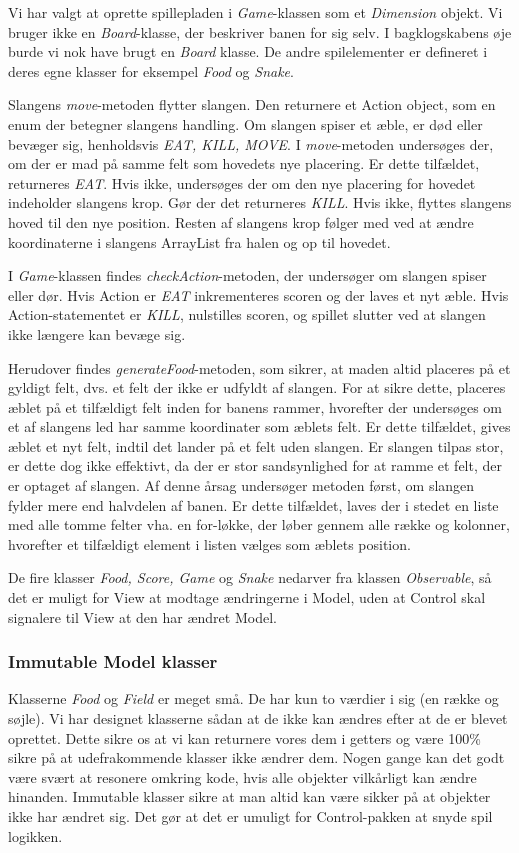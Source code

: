 Vi har valgt at oprette spillepladen i \textit{Game}-klassen som et \textit{Dimension} objekt. Vi bruger ikke en \textit{Board}-klasse, der beskriver banen for sig selv. I bagklogskabens øje burde vi nok have brugt en \textit{Board} klasse. De andre spilelementer er defineret i deres egne klasser for eksempel \textit{Food} og \textit{Snake}.

Slangens \textit{move}-metoden flytter slangen. Den returnere et Action object, som en enum der betegner slangens handling. Om slangen spiser et æble, er død eller bevæger sig, henholdsvis \textit{EAT, KILL, MOVE}. I \textit{move}-metoden undersøges der, om der er mad på samme felt som hovedets nye placering. Er dette tilfældet, returneres \textit{EAT}. Hvis ikke, undersøges der om den nye placering for hovedet indeholder slangens krop. Gør der det returneres \textit{KILL}. Hvis ikke, flyttes slangens hoved til den nye position. Resten af slangens krop følger med ved at ændre koordinaterne i slangens ArrayList fra halen og op til hovedet.

I \textit{Game}-klassen findes \textit{checkAction}-metoden, der undersøger om slangen spiser eller dør. Hvis Action er \textit{EAT} inkrementeres scoren og der laves et nyt æble. Hvis Action-statementet er \textit{KILL}, nulstilles scoren, og spillet slutter ved at slangen ikke længere kan bevæge sig.

Herudover findes \textit{generateFood}-metoden, som sikrer, at maden altid placeres på et gyldigt felt, dvs. et felt der ikke er udfyldt af slangen. For at sikre dette, placeres æblet på et tilfældigt felt inden for banens rammer, hvorefter der undersøges om et af slangens led har samme koordinater som æblets felt. Er dette tilfældet, gives æblet et nyt felt, indtil det lander på et felt uden slangen. Er slangen tilpas stor, er dette dog ikke effektivt, da der er stor sandsynlighed for at ramme et felt, der er optaget af slangen. Af denne årsag undersøger metoden først, om slangen fylder mere end halvdelen af banen. Er dette tilfældet, laves der i stedet en liste med alle tomme felter vha. en for-løkke, der løber gennem alle række og kolonner, hvorefter et tilfældigt element i listen vælges som æblets position.

De fire klasser \textit{Food, Score, Game} og \textit{Snake} nedarver fra klassen \textit{Observable}, så det er muligt for View at modtage ændringerne i Model, uden at Control skal signalere til View at den har ændret Model.

\subsubsection{Immutable Model klasser}
Klasserne \textit{Food} og \textit{Field} er meget små. De har kun to værdier i sig (en række og søjle). Vi har designet klasserne sådan at de ikke kan ændres efter at de er blevet oprettet. Dette sikre os at vi kan returnere vores dem i getters og være 100\% sikre på at udefrakommende klasser ikke ændrer dem. Nogen gange kan det godt være svært at resonere omkring kode, hvis alle objekter vilkårligt kan ændre hinanden. Immutable klasser sikre at man altid kan være sikker på at objekter ikke har ændret sig. Det gør at det er umuligt for Control-pakken at snyde spil logikken.


